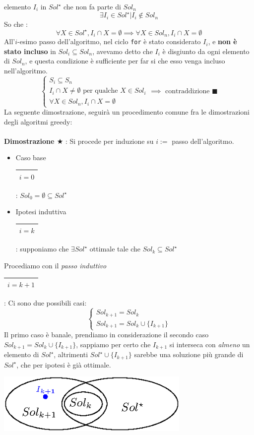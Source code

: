 \documentclass[12pt, letterpaper]{article}
\newcommand{\code}[1]{\colorbox{light-gray}{\texttt{#1}}}
\newcommand{\acc}{\\\hphantom{}\\}
\newcommand{\boxedMath}[1]{\begin{tabular}{|c|}\hline \texttt{#1} \\ \hline\end{tabular} :}
\begin{document}
elemento $I_i$ in $Sol^\star$ che non fa parte di $Sol_n$ $$ \exists I_i\in Sol^\star | I_i\notin Sol_n$$
So che : $$\forall X\in Sol^\star, I_i\cap X = \emptyset\implies \forall X\in Sol_n, I_i\cap X = \emptyset$$
All'$i$-esimo passo dell'algoritmo, nel ciclo \code{for} è stato considerato $I_i$, e \textbf{non è stato incluso} in 
$Sol_i\subseteq Sol_n$, avevamo detto che $I_i$ è disgiunto da ogni elemento di $Sol_n$, e questa condizione è sufficiente 
per far si che esso venga incluso nell'algoritmo. 
$$ \begin{cases}
    S_i\subseteq S_n\\ 
     I_i\cap X \ne \emptyset \text{ per qualche }X\in Sol_i\\
    \forall X\in Sol_n, I_i\cap X = \emptyset
\end{cases}\implies \text{ contraddizione }\blacksquare$$
La seguente dimostrazione, seguirà un procedimento comune fra le dimostrazioni degli algoritmi greedy:\acc 
\textbf{Dimostrazione $\bigstar$} : Si procede per induzione su $i :=$ passo dell'algoritmo.\begin{itemize}
    \item Caso base \boxedMath{$i=0$} $Sol_0 = \emptyset \subseteq Sol^\star$ 
    \item Ipotesi induttiva  \boxedMath{$i=k$} supponiamo che $\exists Sol^\star$ ottimale tale che $Sol_k\subseteq Sol^\star$
\end{itemize}
Procediamo con il \textit{passo induttivo} \boxedMath{$i=k+1$} Ci sono due possibili casi:
 $$\begin{cases}
    Sol_{k+1}=Sol_k\\ 
    Sol_{k+1}=Sol_k \cup \{I_{k+1}\}
\end{cases}$$ 
Il primo caso è banale, prendiamo in considerazione il secondo caso $Sol_{k+1}=Sol_k \cup \{I_{k+1}\}$, sappiamo per certo che 
$I_{k+1}$ si interseca con \textit{almeno} un elemento di $Sol^\star$, altrimenti $Sol^\star\cup \{I_{k+1}\}$ sarebbe una 
soluzione più grande di $Sol^\star$, che per ipotesi è già ottimale.\begin{center}
    \includegraphics[width=0.7\textwidth ]{images/dimPropIntervalli.eps}
\end{center}
\end{document}
